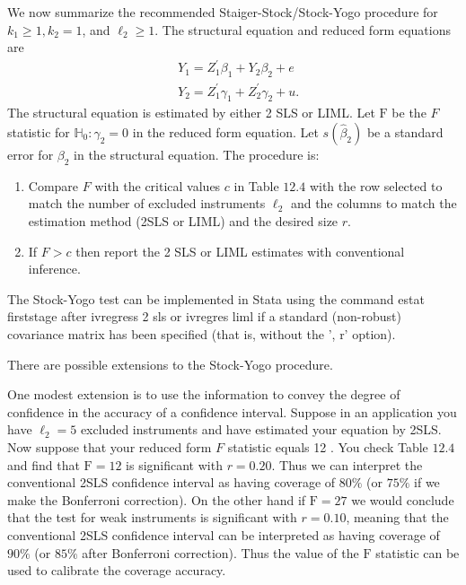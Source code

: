 \documentclass[10pt]{article}
\begin{document}
We now summarize the recommended Staiger-Stock/Stock-Yogo procedure for $k_{1} \geq 1, k_{2}=1$, and $\ell_{2} \geq 1$. The structural equation and reduced form equations are
$$
\begin{aligned}
&Y_{1}=Z_{1}^{\prime} \beta_{1}+Y_{2} \beta_{2}+e \\
&Y_{2}=Z_{1}^{\prime} \gamma_{1}+Z_{2}^{\prime} \gamma_{2}+u .
\end{aligned}
$$
The structural equation is estimated by either 2 SLS or LIML. Let $\mathrm{F}$ be the $F$ statistic for $\mathbb{H}_{0}: \gamma_{2}=0$ in the reduced form equation. Let $s\left(\widehat{\beta}_{2}\right)$ be a standard error for $\beta_{2}$ in the structural equation. The procedure is:

\begin{enumerate}
  \item Compare $F$ with the critical values $c$ in Table $12.4$ with the row selected to match the number of excluded instruments $\ell_{2}$ and the columns to match the estimation method (2SLS or LIML) and the desired size $r$.

  \item If $F>c$ then report the 2 SLS or LIML estimates with conventional inference.

\end{enumerate}
The Stock-Yogo test can be implemented in Stata using the command estat firststage after ivregress 2 sls or ivregres liml if a standard (non-robust) covariance matrix has been specified (that is, without the ', r' option).

There are possible extensions to the Stock-Yogo procedure.

One modest extension is to use the information to convey the degree of confidence in the accuracy of a confidence interval. Suppose in an application you have $\ell_{2}=5$ excluded instruments and have estimated your equation by 2SLS. Now suppose that your reduced form $F$ statistic equals 12 . You check Table $12.4$ and find that $\mathrm{F}=12$ is significant with $r=0.20$. Thus we can interpret the conventional 2SLS confidence interval as having coverage of $80 \%$ (or $75 \%$ if we make the Bonferroni correction). On the other hand if $\mathrm{F}=27$ we would conclude that the test for weak instruments is significant with $r=0.10$, meaning that the conventional 2SLS confidence interval can be interpreted as having coverage of $90 \%$ (or $85 \%$ after Bonferroni correction). Thus the value of the $\mathrm{F}$ statistic can be used to calibrate the coverage accuracy.
\end{document}
